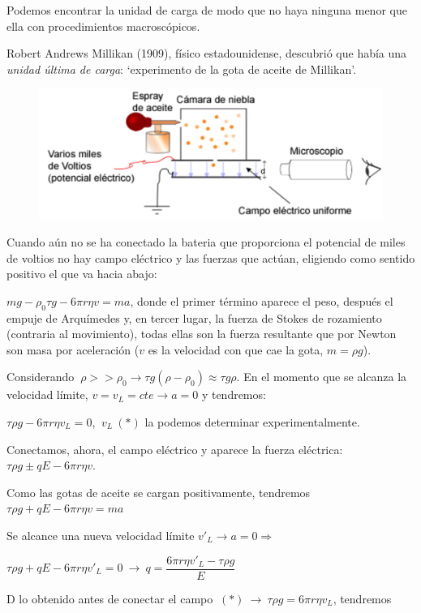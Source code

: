 Podemos encontrar la unidad de carga de modo que no haya ninguna menor que ella con procedimientos macroscópicos.


Robert Andrews Millikan (1909), físico estadounidense, descubrió que había una \emph{unidad última de carga}: `experimento de la gota de aceite de Millikan'.

\begin{figure}[H]
	\centering
	\includegraphics[width=.9\textwidth]{imagenes/imagenes22/T22IM11.png}
\end{figure}

Cuando aún no se ha conectado la bateria que proporciona el potencial de miles de voltios no hay campo eléctrico y las fuerzas que actúan, eligiendo como sentido positivo el que va hacia abajo:

$mg-\rho_0 \tau g -6\pi r \eta v= ma$, donde el primer término aparece el peso, después el empuje de Arquímedes y, en tercer lugar, la fuerza de Stokes de rozamiento (contraria al movimiento), todas ellas son la fuerza resultante que por Newton son masa por aceleración \textcolor{gris}{($v$ es la velocidad con que cae la gota, $m=\rho g$)}.

Considerando $\ \rho>>\rho_0 \to \tau g (\rho-\rho_0)\approx \tau g \rho$. En el momento que se alcanza la velocidad límite, $v=v_L=cte \to a=0$ y tendremos:

$\tau \rho g-6\pi r \eta v_L=0$, $\ v_L \ (*)$ la podemos determinar experimentalmente.

Conectamos, ahora, el campo eléctrico y aparece la fuerza eléctrica: $\tau \rho g \pm q E -6\pi r \eta v$.

Como las gotas de aceite se cargan positivamente, tendremos $\tau \rho g + q E -6\pi r \eta v=ma$

Se alcance una nueva velocidad límite $v'_L \to a =0 \Rightarrow $

$\tau \rho g + q E -6\pi r \eta v'_L=0 \ \to \ q=\dfrac{6\pi r \eta v'_L-\tau \rho g}{E}$

D lo obtenido antes de conectar el campo $\ (*) \ \to \ \tau \rho g=6\pi r \eta v_L$, tendremos

